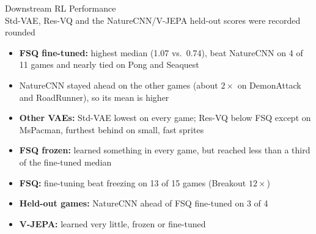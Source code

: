 \documentclass[aspectratio=43,10pt]{beamer}
\begin{document}
\begin{frame}{Downstream RL Performance}
  \centering
  {\footnotesize\setlength{\tabcolsep}{2.5pt}
  }\\[0.2em]
  {\tiny Std-VAE, Res-VQ and the NatureCNN/V-JEPA held-out scores were recorded rounded}
  \vspace{0.2em}
  \begin{itemize}\small\setlength\itemsep{0.12em}
    \item \textbf{FSQ fine-tuned:} highest median (1.07 vs.\ 0.74), beat NatureCNN on 4 of 11
          games and nearly tied on Pong and Seaquest
    \item NatureCNN stayed ahead on the other games (about $2\times$ on DemonAttack and
          RoadRunner), so its mean is higher
    \item \textbf{Other VAEs:} Std-VAE lowest on every game; Res-VQ below FSQ except on MsPacman,
          furthest behind on small, fast sprites
    \item \textbf{FSQ frozen:} learned something in every game, but reached less than a third
          of the fine-tuned median
    \item \textbf{FSQ:} fine-tuning beat freezing on 13 of 15 games (Breakout $12\times$)
    \item \textbf{Held-out games:} NatureCNN ahead of FSQ fine-tuned on 3 of 4
    \item \textbf{V-JEPA:} learned very little, frozen or fine-tuned
  \end{itemize}
\end{frame}
\end{document}
